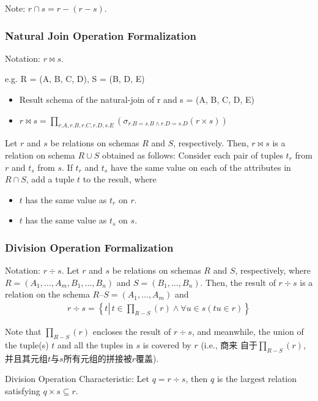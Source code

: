 Note: $r\cap s = r - (r-s)$.  

\subsubsection{Natural Join Operation Formalization}
Notation: $r \bowtie  s$. 

e.g. R = (A, B, C, D), S = (B, D, E)
\begin{itemize}
    \item Result schema of the natural-join of r and s = (A, B, C, D, E)
    \item $\displaystyle r \bowtie s = \prod_{r.A, r.B, r.C, r.D, s.E} (\sigma_{r.B=s.B \land r.D = s.D}(r\times s))$
\end{itemize}

Let $r$ and $s$ be relations on schemas $R$ and $S$, respectively. Then, $r \bowtie s$ is a relation on schema $R \cup S$ obtained as follows: Consider each pair of tuples $t_r$ from $r$ and $t_s$ from $s$. If $t_r$ and $t_s$ have the same value on each of the attributes in $R \cap S$, add a tuple $t$ to the result, where
\begin{itemize}
    \item $t$ has the same value as $t_r$ on $r$. 
    \item $t$ has the same value as $t_s$ on $s$. 
\end{itemize}

\subsubsection{Division Operation Formalization}
Notation: $r\div s$. Let $r$ and $s$ be relations on schemas $R$ and $S$, respectively, where $R = (A_1, \dots, A_m, B_1, \dots, B_n)$ and $S = (B_1, \dots, B_n)$. Then, the result of $r \div s$ is a relation on the schema $R – S = (A_1, \dots, A_m)$ and
\begin{align*}
    r\div s=\left\{ t \left| \, t \in \prod_{R-S}(r) \land \forall u \in s(tu \in r )\right. \right\}
\end{align*}

Note that $\prod_{R-S}(r)$ encloses the result of $r \div s$, and meanwhile, the  union of the tuple(s) $t$ and all the tuples in $s$ is covered by $r$ (i.e., 商来 自于$\prod_{R-S}(r)$, 并且其元组$t$与$s$所有元组的拼接被$r$覆盖).

Division Operation Characteristic: Let $q = r \div s$, then $q$ is the largest relation satisfying $q \times s \subseteq r$. 


